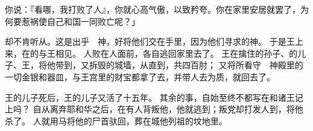 {你说：『看哪，我打败了{}人』，你就心高气傲，以致矜夸。你在家里安居就罢了，为何要惹祸使自己和{}国一同败亡呢？」
\par }{\PP {}却不肯听从。这是出乎　神，好将他们交在{}手里，因为他们寻求{}的神。
于是{}王{}上来，在{}的{}与{}王{}相见{}。
人败在{}人面前，各自逃回家里去了。
王{}在{}擒住{}的孙子、{}的儿子、{}王{}，将他带到{}，又拆毁{}的城墙，从{}直到{}，共四百肘；
又将{}所看守　神殿里的一切金银和器皿，与王宫里的财宝都拿了去，并带人去为质，就回{}去了。
\par }{\PP {}王{}的儿子{}死后，{}王{}的儿子{}又活了十五年。
其余的事，自始至终不都写在{}和{}诸王记上吗？
自从{}离弃耶和华之后，在{}有人背叛他，他就逃到{}；叛党却打发人到{}，将他杀了。
人就用马将他的尸首驮回，葬在{}{}城他列祖的坟地里。

}
